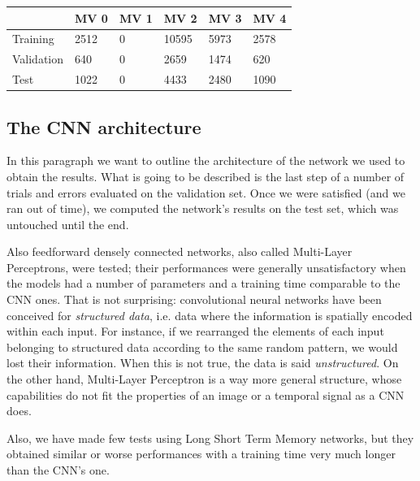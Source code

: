 \documentclass[a4paper, twoside]{article}
\begin{document}
        \begin{table}[H]
        \begin{tabular}{l|l|l|l|l|l|}
        \cline{2-6}
                                         & MV 0 & MV 1 & MV 2  & MV 3 & MV 4 \\ \hline
        \multicolumn{1}{|l|}{Training}   & 2512 & 0    & 10595 & 5973 & 2578 \\ \hline
        \multicolumn{1}{|l|}{Validation} & 640  & 0    & 2659  & 1474 & 620  \\ \hline
        \multicolumn{1}{|l|}{Test}       & 1022 & 0    & 4433  & 2480 & 1090 \\ \hline
        \end{tabular}
        \end{table}



\subsection{The CNN architecture}
In this paragraph we want to outline the architecture of the network we used to obtain the results. What is going to be described is the last step of a number of trials and errors evaluated on the validation set. Once we were satisfied (and we ran out of time), we computed the network's results on the test set, which was untouched until the end.

Also feedforward densely connected networks, also called Multi-Layer Perceptrons, were tested; their performances were generally unsatisfactory when the models had a number of parameters and a training time comparable to the CNN ones. That is not surprising: convolutional neural networks have been conceived for \textit{structured data}, i.e. data where the information is spatially encoded within each input. For instance, if we rearranged the elements of each input belonging to structured data according to the same random pattern, we would lost their information. When this is not true, the data is said \textit{unstructured}.
On the other hand, Multi-Layer Perceptron is a way more general structure, whose capabilities do not fit the properties of an image or a temporal signal as a CNN does.

Also, we have made few tests using Long Short Term Memory networks, but they obtained similar or worse performances with a training time very much longer than the CNN's one.
\end{document}
